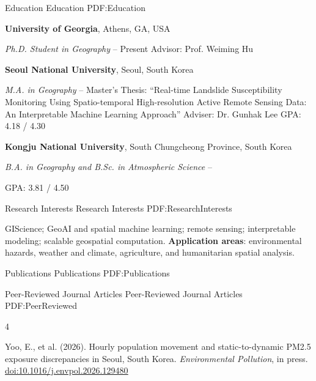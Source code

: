 \documentclass[letterpaper,MMMyyyy,nonstopmode]{simpleresumecv}
\newcommand{\PublicationItem}[2]{%
  \phantomsection\label{pub:#1}%
  \expandafter\gdef\csname pubnum:#1\endcsname{#2}%
  \NumberedItem{[#2]}%
}
\begin{document}
\begin{Body}
\raggedright


\Section
{Education}
{Education}
{PDF:Education}

\Entry
{\textbf{University of Georgia}},
Athens, GA, USA

\Gap
\textit{       Ph.D. Student in Geography}
\hfill
{} -- Present
\Gap
\SubBulletItem
Advisor: Prof. Weiming Hu

\BigGap
\Entry
{\textbf{Seoul National University}},
Seoul, South Korea

\Gap
\textit{       M.A. in Geography}
\hfill
{} --
\Gap
\SubBulletItem
Master's Thesis: ``Real-time Landslide Susceptibility Monitoring Using Spatio-temporal High-resolution Active Remote Sensing Data: An Interpretable Machine Learning Approach''
\Gap
\SubBulletItem
Adviser: Dr. Gunhak Lee
\Gap
\SubBulletItem
GPA: 4.18 / 4.30

\BigGap
\Entry
{\textbf{Kongju National University}},
South Chungcheong Province, South Korea

\Gap
\textit{       B.A. in Geography and B.Sc. in Atmospheric Science}
\hfill
{} --

\Gap
\SubBulletItem
GPA: 3.81 / 4.50


\Section
{Research Interests}
{Research Interests}
{PDF:ResearchInterests}

\Entry
GIScience; GeoAI and spatial machine learning; remote sensing; interpretable modeling;
scalable geospatial computation.
\Gap
\textbf{Application areas}: environmental hazards, weather and climate,
agriculture, and humanitarian spatial analysis.
\BigGap



\Section
{Publications}
{Publications}
{PDF:Publications}

\SubSection
{Peer-Reviewed Journal Articles}
{Peer-Reviewed Journal Articles}
{PDF:PeerReviewed}

\Gap
\PublicationItem{hourly-population-pm25}{4}
Yoo, E., et al. (2026).
Hourly population movement and static-to-dynamic PM2.5 exposure discrepancies in Seoul, South Korea.
\textit{Environmental Pollution}, in press.
\href{https://doi.org/10.1016/j.envpol.2026.129480}{\underline{doi:10.1016/j.envpol.2026.129480}}


\end{Body}
\end{document}
